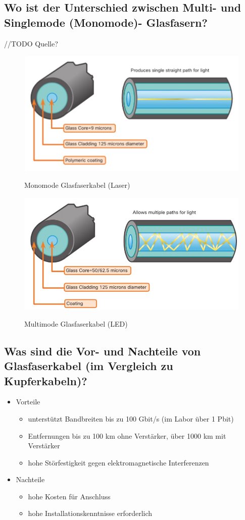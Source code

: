 \subsection*{Wo ist der Unterschied zwischen Multi- und Singlemode (Monomode)- Glasfasern?}
//TODO Quelle?
\begin{multicols*}{2}
    \begin{figure}[H]
        \begin{center}
        \label{pic:Monomode}
        \includegraphics[width=.5\textwidth]{images/single_mode.jpg}
        \caption{Monomode Glasfaserkabel (Laser)}
        \end{center}
    \end{figure}
    \columnbreak
    \begin{figure}[H]
        \begin{center}
        \label{pic:Multimode}
        \includegraphics[width=.5\textwidth]{images/multi_mode.jpg}
        \caption{Multimode Glasfaserkabel (LED)}
        \end{center}
    \end{figure}
\end{multicols*}

\subsection*{Was sind die Vor- und Nachteile von Glasfaserkabel (im Vergleich zu Kupferkabeln)?}
\begin{itemize}
    \item Vorteile
    \begin{itemize}
        \item unterstützt Bandbreiten bis zu 100 Gbit/s (im Labor über 1 Pbit)
        \item Entfernungen bis zu 100 km ohne Verstärker, über 1000 km mit Verstärker
        \item hohe Störfestigkeit gegen elektromagnetische Interferenzen
    \end{itemize}
    \item Nachteile
    \begin{itemize}
        \item hohe Kosten für Anschluss
        \item hohe Installationskenntnisse erforderlich
    \end{itemize}
\end{itemize}

